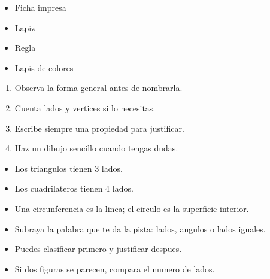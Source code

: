 \documentclass[12pt,a4paper]{article}
\begin{document}
        \FichaCabecera

        \begin{materialesbox}
        \begin{itemize}
    \item Ficha impresa
    \item Lapiz
    \item Regla
    \item Lapis de colores
\end{itemize}
        \end{materialesbox}

        \begin{pasosbox}
        \begin{enumerate}
    \item Observa la forma general antes de nombrarla.
    \item Cuenta lados y vertices si lo necesitas.
    \item Escribe siempre una propiedad para justificar.
    \item Haz un dibujo sencillo cuando tengas dudas.
\end{enumerate}
        \end{pasosbox}

        \begin{recordatoriobox}
        \begin{itemize}
    \item Los triangulos tienen 3 lados.
    \item Los cuadrilateros tienen 4 lados.
    \item Una circunferencia es la linea; el circulo es la superficie interior.
\end{itemize}
        \end{recordatoriobox}

        \begin{apoyobox}
        \begin{itemize}
    \item Subraya la palabra que te da la pista: lados, angulos o lados iguales.
    \item Puedes clasificar primero y justificar despues.
    \item Si dos figuras se parecen, compara el numero de lados.
\end{itemize}
        \end{apoyobox}


\end{document}
